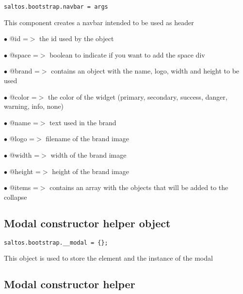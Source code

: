 \documentclass[a4paper]{book}
\begin{document}
\begin{lstlisting}
saltos.bootstrap.navbar = args
\end{lstlisting}

This component creates a navbar intended to be used as header

\begin{compactitem}
\item[\color{myblue}$\bullet$] @id    =$>$ the id used by the object
\item[\color{myblue}$\bullet$] @space =$>$ boolean to indicate if you want to add the space div
\item[\color{myblue}$\bullet$] @brand =$>$ contains an object with the name, logo, width and height to be used
\item[\color{myblue}$\bullet$] @color =$>$ the color of the widget (primary, secondary, success, danger, warning, info, none)
\end{compactitem}

\begin{compactitem}
\item[\color{myblue}$\bullet$] @name   =$>$ text used in the brand
\item[\color{myblue}$\bullet$] @logo   =$>$ filename of the brand image
\item[\color{myblue}$\bullet$] @width  =$>$ width of the brand image
\item[\color{myblue}$\bullet$] @height =$>$ height of the brand image
\end{compactitem}

\begin{compactitem}
\item[\color{myblue}$\bullet$] @items =$>$ contains an array with the objects that will be added to the collapse
\end{compactitem}

\hypertarget{toc500}{}
\subsection{Modal constructor helper object}

\begin{lstlisting}
saltos.bootstrap.__modal = {};
\end{lstlisting}

This object is used to store the element and the instance of the modal

\hypertarget{toc501}{}
\subsection{Modal constructor helper}
\end{document}
